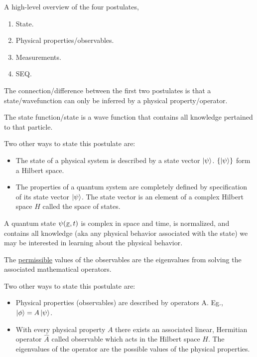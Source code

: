 \documentclass{school-22.101-notes}
\date{September 12, 2011}
\begin{document}
\maketitle

A high-level overview of the four postulates, 
\begin{enumerate}
\item State. 
\item Physical properties/observables. 
\item Measurements. 
\item SEQ. 
\end{enumerate}
The connection/difference between the first two postulates is that a state/wavefunction can only be inferred by a physical property/operator. 


\begin{axiom} 
    The state function/state is a wave function that contains all knowledge pertained to that particle. 
\end{axiom}
Two other ways to state this postulate are: 
\begin{itemize}
\item The state of a physical system is described by a state vector $\left| \psi \right>$. $\left\{ \left| \psi \right> \right\}$ form a Hilbert space.
\item The properties of a quantum system are completely defined by specification of its state vector $\left| \psi \right>$. The state vector is an element of a complex Hilbert space $H$ called the space of states.
\end{itemize}
A quantum state $\psi(\underline{x}, t)$ is complex in space and time, is normalized, and contains all knowledge (aka any physical behavior associated with the state) we may be interested in learning about the physical behavior. 


\clearpage
{}
\begin{axiom} 
    The \uline{permissible} values of the observables are the eigenvalues from solving the associated mathematical operators.
\end{axiom}
Two other ways to state this postulate are:
\begin{itemize}
\item Physical properties (observables) are described by operators A. Eg., $\left| \phi \right> = A \left| \psi \right>$. 
\item With every physical property $A$ there exists an associated linear, Hermitian operator $\hat{A}$ called observable which acts in the Hilbert space $H$. The eigenvalues of the operator are the possible values of the physical properties.
\end{itemize}
\end{document}
